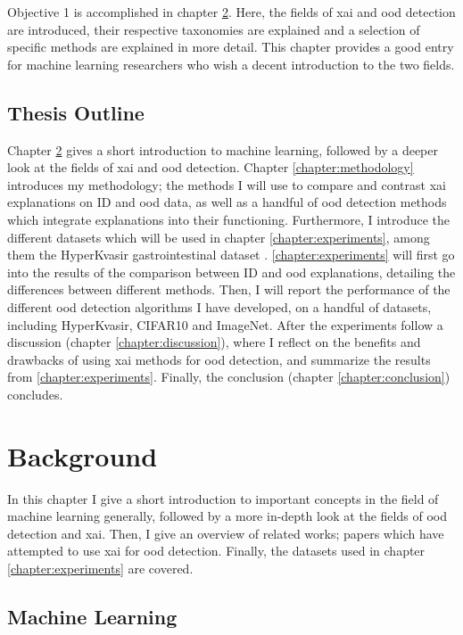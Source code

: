 \documentclass[UKenglish]{uiomasterthesis} %
\theoremstyle{definition}
\begin{document}
Objective 1 is accomplished in chapter \ref{chapter:background}. Here, the fields of \ac{xai} and \ac{ood} detection are introduced, their respective taxonomies are explained and a selection of specific methods are explained in more detail. This chapter provides a good entry for machine learning researchers who wish a decent introduction to the two fields.

\section{Thesis Outline}

Chapter \ref{chapter:background} gives a short introduction to machine learning, followed by a deeper look at the fields of \ac{xai} and \ac{ood} detection. Chapter \ref{chapter:methodology} introduces my methodology; the methods I will use to compare and contrast \ac{xai} explanations on ID and \ac{ood} data, as well as a handful of \ac{ood} detection methods which integrate explanations into their functioning. Furthermore, I introduce the different datasets which will be used in chapter \ref{chapter:experiments}, among them the HyperKvasir gastrointestinal dataset \cite{hyperkvasir}. \ref{chapter:experiments} will first go into the results of the comparison between ID and \ac{ood} explanations, detailing the differences between different methods. Then, I will report the performance of the different \ac{ood} detection algorithms I have developed, on a handful of datasets, including HyperKvasir, CIFAR10 and ImageNet. After the experiments follow a discussion (chapter \ref{chapter:discussion}), where I reflect on the benefits and drawbacks of using \ac{xai} methods for \ac{ood} detection, and summarize the results from \ref{chapter:experiments}. Finally, the conclusion (chapter \ref{chapter:conclusion}) concludes.

\chapter{Background} \label{chapter:background}

In this chapter I give a short introduction to important concepts in the field of machine learning generally, followed by a more in-depth look at the fields of \ac{ood} detection and \ac{xai}. Then, I give an overview of related works; papers which have attempted to use \ac{xai} for \ac{ood} detection. Finally, the datasets used in chapter \ref{chapter:experiments} are covered. 

\section{Machine Learning}
\end{document}
